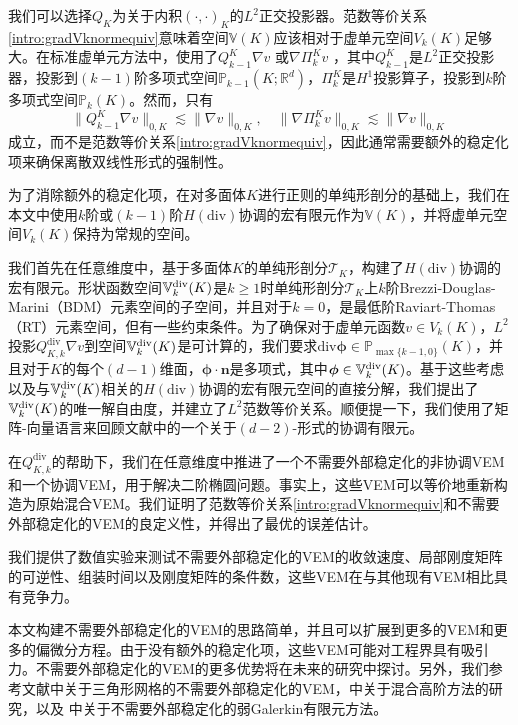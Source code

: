 我们可以选择$Q_{K}$为关于内积$(\cdot, \cdot)_K$的$L^2$正交投影器。范数等价关系\eqref{intro:gradVknormequiv}意味着空间$\mathbb{V}(K)$应该相对于虚单元空间$V_k(K)$足够大。在标准虚单元方法中，使用了$Q_{k-1}^{K}\nabla v$ \cite{BeiraodaVeigaBrezziMariniRusso2016}或$\nabla\Pi_k^{K}v$ \cite{BeiraoBrezziCangianiManziniEtAl2013,BeiraoBrezziMariniRusso2014,AhmadAlsaediBrezziMariniEtAl2013,AyusodeDiosLipnikovManzini2016}，其中$Q_{k-1}^{K}$是$L^2$正交投影器，投影到$(k-1)$阶多项式空间$\mathbb P_{k-1}(K; \mathbb{R}^d)$，$\Pi_k^{K}$是$H^1$投影算子，投影到$k$阶多项式空间$\mathbb P_{k}(K)$。然而，只有
\[
\|Q_{k-1}^{K}\nabla v\|_{0,K}\lesssim \|\nabla v\|_{0,K}, \quad \|\nabla\Pi_k^{K}v\|_{0,K}\lesssim \|\nabla v\|_{0,K}
\]
成立，而不是范数等价关系\eqref{intro:gradVknormequiv}，因此通常需要额外的稳定化项来确保离散双线性形式的强制性。

为了消除额外的稳定化项，在对多面体$K$进行正则的单纯形剖分的基础上，我们在本文中使用$k$阶或$(k-1)$阶$H(\mathrm{div})$协调的宏有限元作为$\mathbb{V}(K)$，并将虚单元空间$V_k(K)$保持为常规的空间。

我们首先在任意维度中，基于多面体$K$的单纯形剖分$\mathcal T_K$，构建了$H(\mathrm{div})$协调的宏有限元。形状函数空间$\mathbb{V}_{k}^{\rm div}(K)$是$k\geq1$时单纯形剖分$\mathcal T_K$上$k$阶Brezzi-Douglas-Marini（BDM）元素空间的子空间，并且对于$k=0$，是最低阶Raviart-Thomas（RT）元素空间，但有一些约束条件。为了确保对于虚单元函数$v\in V_k(K)$，$L^2$投影$Q_{K,k}^{\mathrm{div}}\nabla v$到空间$\mathbb{V}_{k}^{\rm div}(K)$是可计算的，我们要求$\mathrm{div}\boldsymbol{\phi}\in\mathbb P_{\max\{k-1,0\}}(K)$，并且对于$K$的每个$(d-1)$维面，$\boldsymbol{\phi}\cdot\boldsymbol{n}$是多项式，其中$\boldsymbol{\phi}\in\mathbb{V}_{k}^{\rm div}(K)$。基于这些考虑以及与$\mathbb{V}_{k}^{\rm div}(K)$相关的$H(\mathrm{div})$协调的宏有限元空间的直接分解，我们提出了$\mathbb{V}_{k}^{\rm div}(K)$的唯一解自由度，并建立了$L^2$范数等价关系。顺便提一下，我们使用了矩阵-向量语言来回顾文献\cite{ArnoldFalkWinther2006,Arnold2018}中的一个关于$(d-2)$-形式的协调有限元。

在$Q_{K,k}^{\mathrm{div}}$的帮助下，我们在任意维度中推进了一个不需要外部稳定化的非协调VEM和一个协调VEM，用于解决二阶椭圆问题。事实上，这些VEM可以等价地重新构造为原始混合VEM。我们证明了范数等价关系\eqref{intro:gradVknormequiv}和不需要外部稳定化的VEM的良定义性，并得出了最优的误差估计。

我们提供了数值实验来测试不需要外部稳定化的VEM的收敛速度、局部刚度矩阵的可逆性、组装时间以及刚度矩阵的条件数，这些VEM在与其他现有VEM相比具有竞争力。

本文构建不需要外部稳定化的VEM的思路简单，并且可以扩展到更多的VEM和更多的偏微分方程。由于没有额外的稳定化项，这些VEM可能对工程界具有吸引力。不需要外部稳定化的VEM的更多优势将在未来的研究中探讨。另外，我们参考文献\cite{XuZhang2023}中关于三角形网格的不需要外部稳定化的VEM，\cite{CicuttinErnLemaire2019}中关于混合高阶方法的研究，以及
\cite{YeZhang2020,AlTaweelWang2020,AlTaweelWang2020a,YeZhang2021,YeZhang2021a,AlTaweelWangYeZhang2021}
中关于不需要外部稳定化的弱Galerkin有限元方法。



